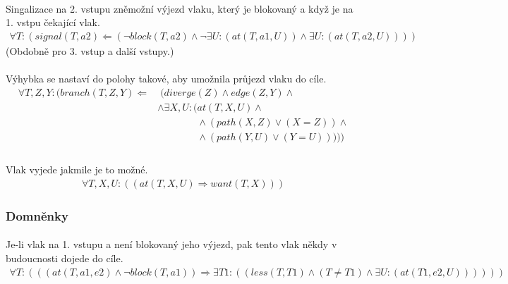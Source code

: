 \documentclass[a4paper,journal]{IEEEtran}
\begin{document}
\paragraph*{}{Singalizace na 2. vstupu zněmožní výjezd vlaku, který je blokovaný a když je na 1. vstpu čekající vlak.}
\begin{equation}
\begin{split}
\forall T:\left( signal\left(T,a2\right) \Leftarrow ( \neg block\left(T,a2\right) \wedge \neg \exists U:\left(at\left(T,a1,U\right)\right) \wedge \exists U:\left(at\left(T,a2,U\right)\right) ) \right)
\end{split}
\end{equation}
{(Obdobně pro 3. vstup a další vstupy.)}
\paragraph*{}{Výhybka se nastaví do polohy takové, aby umožnila průjezd vlaku do cíle.}
\begin{equation}
\begin{split}
\forall T,Z,Y:
(
branch\left(T,Z,Y\right) \Leftarrow &\;
(
diverge\left(Z\right) \wedge 
edge\left(Z,Y\right) \wedge \\
&\wedge \exists X,U:
( at\left(T,X,U\right) \wedge \\
&\qquad\qquad\wedge ( path\left(X,Z\right) \vee (X = Z) ) \wedge \\
&\qquad\qquad\wedge ( path\left(Y,U\right) \vee (Y = U) )
)
)
)\\
\end{split}
\end{equation}
\paragraph*{}{Vlak vyjede jakmile je to možné.}
\begin{equation}
\begin{split}
\forall T,X,U:\left((at\left(T,X,U\right) \Rightarrow want\left(T,X\right))\right)
\end{split}
\end{equation}

\subsubsection{Domněnky}
\paragraph*{}Je-li vlak na 1. vstupu a není blokovaný jeho výjezd, pak tento vlak někdy v budoucnosti dojede do cíle.
\begin{equation}
\begin{split}
\forall T:\left(((at\left(T,a1,e2\right) \wedge \neg block\left(T,a1\right)) \Rightarrow \exists T1:\left((less\left(T,T1\right) \wedge (T \neq T1) \wedge \exists U:\left(at\left(T1,e2,U\right)\right))\right))\right)
\end{split}
\end{equation}
\end{document}
